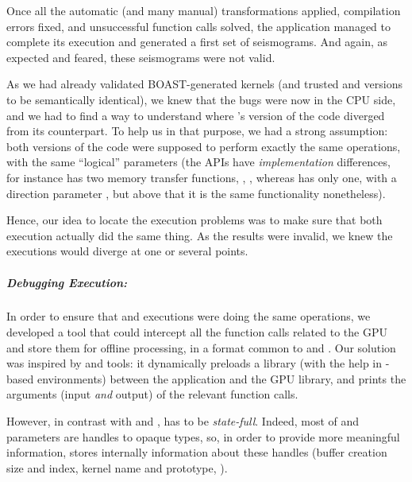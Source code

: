 Once all the automatic (and many manual) transformations applied,
compilation errors fixed, and \OCL unsuccessful function calls solved,
the application managed to complete its execution and generated a
first set of seismograms. And again, as expected and feared, these
seismograms were not valid.

As we had already validated BOAST-generated kernels (and trusted \Cuda
and \OCL versions to be semantically identical), we knew that the bugs
were now in the CPU side, and we had to find a way to understand where
\Specfem's \Cuda version of the code diverged from its \OCL
counterpart. To help us in that purpose, we had a strong assumption:
both versions of the code were supposed to perform exactly the same
operations, with the same ``logical'' parameters (the APIs have
\emph{implementation} differences, for instance \OCL has two memory
transfer functions, ,
, whereas \Cuda has only one, with a
direction parameter , but above that it is
the same functionality nonetheless).

Hence, our idea to locate the execution problems was to make sure that
both execution actually did the same thing. As the \OCL results were
invalid, we knew the executions would diverge at one or several
points.

\subparagraph{Debugging \OCL Execution: } In order to
ensure that \Cuda and \OCL executions were doing the same operations,
we developed a tool that could intercept all the function calls
related to the GPU and store them for offline processing, in a format
common to \OCL and \Cuda. Our solution was inspired by 
and  tools: it dynamically preloads a library (with the
help  in -based environments)
between the application and the GPU library, and prints the arguments
(input \emph{and} output) of the relevant function calls.

However, in contrast with  and ,
 has to be \emph{state-full}. Indeed, most of \OCL and
\Cuda parameters are handles to opaque types, so, in order to provide
more meaningful information,  stores internally
information about these handles (buffer creation size and index,
kernel name and prototype, \etc). %

